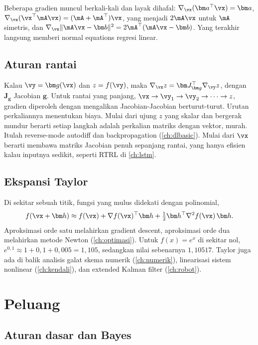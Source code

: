 Beberapa gradien muncul berkali-kali dan layak dihafal: $\nabla_{\vx}(\bm a^\top\vx)=\bm a$,
$\nabla_{\vx}(\vx^\top\mA\vx)=(\mA+\mA^\top)\vx$, yang menjadi $2\mA\vx$ untuk $\mA$ simetris, dan
$\nabla_{\vx}\|\mA\vx-\bm b\|^2=2\mA^\top(\mA\vx-\bm b)$. Yang terakhir langsung memberi normal equations regresi linear.

\subsection{Aturan rantai}

Kalau $\vy=\bm g(\vx)$ dan $z=f(\vy)$, maka $\nabla_{\vx}z=\bm J_{\bm g}^\top\nabla_{\vy}z$, dengan $\bm J_{\bm g}$ Jacobian $\bm g$.
Untuk rantai yang panjang, $\vx\to\vy_1\to\vy_2\to\cdots\to z$, gradien diperoleh dengan mengalikan Jacobian-Jacobian berturut-turut.
Urutan perkaliannya menentukan biaya. Mulai dari ujung $z$ yang skalar dan bergerak mundur berarti setiap langkah adalah
perkalian matriks dengan vektor, murah. Itulah reverse-mode autodiff dan backpropagation (\cref{ch:dlbasic}). Mulai dari
$\vx$ berarti membawa matriks Jacobian penuh sepanjang rantai, yang hanya efisien kalau inputnya sedikit, seperti RTRL di
\cref{ch:lstm}.

\subsection{Ekspansi Taylor}

Di sekitar sebuah titik, fungsi yang mulus didekati dengan polinomial,
\begin{equation}
f(\vx+\bm h)\approx f(\vx)+\nabla f(\vx)^\top\bm h+\tfrac12\bm h^\top\nabla^2f(\vx)\,\bm h .
\end{equation}
Aproksimasi orde satu melahirkan gradient descent, aproksimasi orde dua melahirkan metode Newton (\cref{ch:optimasi}). Untuk
$f(x)=e^x$ di sekitar nol, $e^{0{,}1}\approx1+0{,}1+0{,}005=1{,}105$, sedangkan nilai sebenarnya $1{,}10517$. Taylor juga ada di
balik analisis galat skema numerik (\cref{ch:numerik}), linearisasi sistem nonlinear (\cref{ch:kendali}), dan extended Kalman
filter (\cref{ch:robot}).

\section{Peluang}

\subsection{Aturan dasar dan Bayes}


